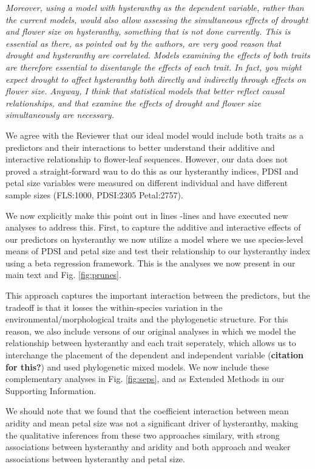 \documentclass{article}[12pt]
\begin{document}
\emph{Moreover, using a model with hysteranthy as the dependent variable, rather than the current models, would also allow assessing the simultaneous effects of drought and flower size on hysteranthy, something that is not done currently. This is essential as there, as pointed out by the authors, are very good reason that drought and hysteranthy are correlated. Models examining the effects of both traits are therefore essential to disentangle the effects of each trait. In fact, you might expect drought to affect hysteranthy both directly and indirectly through effects on flower size. Anyway, I think that statistical models that better reflect causal relationships, and that examine the effects of drought and flower size simultaneously are necessary.}

We agree with the Reviewer that our ideal model would include both traits as a predictors and their interactions to better understand their additive and interactive relationship to flower-leaf sequences. However, our data does not proved a straight-forward wau to do this as our  hysteranthy indices, PDSI and petal size variables were measured on different individual and have different sample sizes (FLS:1000, PDSI:2305 Petal:2757).

We now explicitly make this point out in lines -lines  and have executed new analyses to address this. First, to capture the additive and interactive effects of our predictors on hysteranthy we now utilize a model where we use species-level means of PDSI and petal size and test their relationship to our hysteranthy index using a beta regression framework. This is the analyses we now present in our main text and Fig. \ref{fig:prunes}.

This approach captures the important interaction between the predictors, but the tradeoff is that it losses the within-species variation in the environmental/morphological traits and the phylogenetic structure. For this reason, we also include versons of our original analyses in which we model the relationship between hysteranthy and each trait seperately, which allows us to interchange the placement of the dependent and independent variable (\textbf{citation for this?}) and used phylogenetic mixed models. We now include these complementary analyses in Fig. \ref{fig:seps}, and as Extended Methods in our Supporting Information.

We should note that we found that the coefficient interaction between mean aridity and mean petal size was not a significant driver of hysteranthy, making the qualitative inferences from these two approaches similary, with strong associations between hysteranthy and aridity and both approach and weaker associations between hysteranthy and petal size. 
\end{document}
